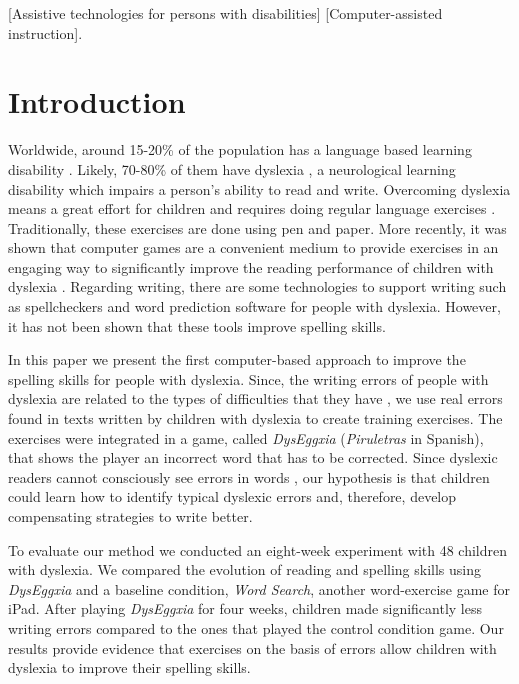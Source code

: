 \documentclass[letterpaper]{sig-alternate-2013}
\begin{document}

[Assistive technologies for persons with disabilities]
[Computer-assisted instruction].



\section{Introduction}
Worldwide, around 15-20\% of the population has a language based learning disability \cite{IDA}. Likely, 70-80\% of them have dyslexia \cite{IDA}, a neurological learning disability which impairs a person's ability to read and write.  Overcoming dyslexia means a great effort for children and requires doing regular language exercises \cite{Hornsby2011}. Traditionally, these exercises are done using pen and paper. More recently, it was shown that computer games are a convenient medium to provide exercises in an engaging way to significantly improve the reading performance of children with dyslexia \cite{Kyle2013,Lyytinen2007}. Regarding writing, there are some technologies to support writing such as spellcheckers and word prediction software for people with dyslexia. However, it has not been shown that these tools improve spelling skills. 

In this paper we present the first computer-based approach to improve the spelling skills for people with dyslexia. Since, the writing errors of people with dyslexia are related to the types of difficulties that they have \cite{Sterling1998}, we use real errors found in texts written by children with dyslexia to create training exercises. The exercises were integrated in a game, called {\it DysEggxia} ({\it Piruletras} in Spanish), that shows the player an incorrect word that has to be corrected. Since dyslexic readers cannot consciously see errors in words \cite{Bruck1988,WWW2012}, our hypothesis is that children could learn how to identify typical dyslexic errors and, therefore, develop compensating strategies to write better.





To evaluate our method we conducted an eight-week experiment with 48 children with dyslexia. We compared the evolution of reading and spelling skills using {\it DysEggxia} and a baseline condition, {\it  Word Search},  another word-exercise game for iPad.
After playing {\it DysEggxia} for four weeks, children made significantly less writing errors compared to the ones that played the control condition game. Our results provide evidence that exercises on the basis of errors allow children with dyslexia to improve their spelling skills.
\end{document}
